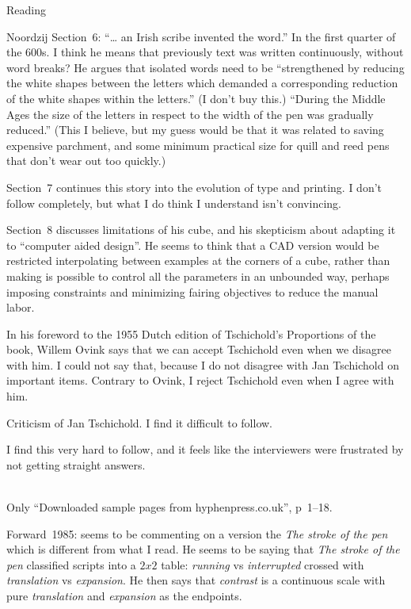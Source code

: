\documentclass[11pt]{PalisadesLakesBook}
\begin{document}
\begin{plSection}{Reading}
\begin{plSection}{Noordzij}
Section~6: ``{\ldots} an Irish scribe invented the word.''
In the first quarter of the 600s.
I think he means that previously text was written continuously,
without word breaks?
He argues that isolated words need to be 
``strengthened by reducing the white shapes between the letters
which demanded a corresponding reduction of the white shapes 
within the letters.''
(I don't buy this.) 
``During the Middle Ages the size of the letters in respect 
to the width of the pen was gradually reduced.''
(This I believe, but my guess would be that it was related 
to saving expensive parchment, and some minimum practical size
for quill and reed pens that don't wear out too quickly.)
 
Section~7 continues this story into the evolution of type 
and printing. 
I don't follow completely, but what I do think I understand isn't
convincing.

Section~8 discusses limitations of his cube,
and his skepticism about adapting it to ``computer aided design''.
He seems to think that a CAD version would be restricted 
interpolating between examples at the corners of a cube,
rather than making is possible to control all the parameters
in an unbounded way, perhaps imposing constraints
and minimizing fairing objectives to reduce the manual labor.

\begin{plQuote}{}{}
In his foreword to the 1955 Dutch edition of 
Tschichold's Proportions of the book, 
Willem Ovink says that we can accept Tschichold 
even when we disagree with him. 
I could not say that, because I do not disagree 
with Jan Tschichold on important items. 
Contrary to Ovink, I reject Tschichold even when I agree with him.
\end{plQuote}%

Criticism of Jan Tschichold.
I find it difficult to follow.


I find this very hard to follow, 
and it feels like the interviewers were frustrated 
by not getting straight answers.
 
\\
Only ``Downloaded sample pages from hyphenpress.co.uk'',
p~1--18.

Forward~1985: seems to be commenting on a version the 
\emph{The stroke of the pen} which is different from what I read.
He seems to be saying that \emph{The stroke of the pen}
classified scripts into a $2x2$ table:
\emph{running} vs \emph{interrupted} crossed with
\emph{translation} vs \emph{expansion}.
He then says that \emph{contrast} is a continuous scale
with pure \emph{translation} and \emph{expansion} as the endpoints.


\end{plSection}
\end{plSection}
\end{document}

